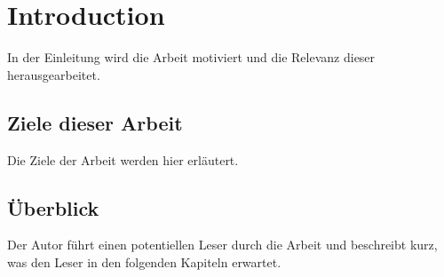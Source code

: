 \chapter{Introduction}
In der Einleitung wird die Arbeit motiviert und die Relevanz dieser herausgearbeitet.

\section{Ziele dieser Arbeit}
Die Ziele der Arbeit werden hier erläutert. 

\section{Überblick}
Der Autor führt einen potentiellen Leser durch die Arbeit und beschreibt kurz, was den Leser in den folgenden Kapiteln erwartet.



